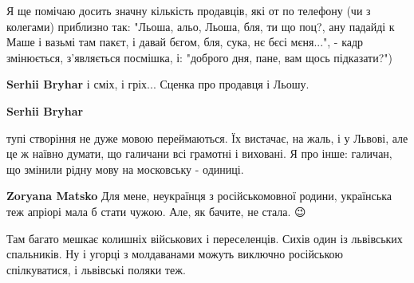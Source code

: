 \begin{itemize}
\begin{itemize}
 

Я ще помічаю досить значну кількість продавців, які от по телефону (чи з
колегами) приблизно так: "Льоша, альо, Льоша, бля, ти що поц?, ану падайді к
Маше і вазьмі там пакєт, і давай бєгом, бля, сука, нє бєсі мєня...", - кадр
змінюється, з'являється посмішка, і: "доброго дня, пане, вам щось підказати?")


 
\textbf{Serhii Bryhar} і сміх, і гріх... Сценка про продавця і Льошу.

 
\textbf{Serhii Bryhar}

тупі створіння не дуже мовою переймаються. Їх вистачає, на жаль, і у Львові,
але це ж наївно думати, що галичани всі грамотні і виховані. Я про
інше: галичан, що змінили рідну мову на московську - одиниці.


 
\textbf{Zoryana Matsko} Для мене, неукраїнця з російськомовної родини,
українська теж апріорі мала б стати чужою. Але, як бачите, не стала. 😉

\end{itemize}

 

Там багато мешкає колишніх військових і переселенців. Сихів один із львівських
спальників. Ну і угорці з молдаванами можуть виключно російською спілкуватися,
і львівські поляки теж.



\end{itemize}
